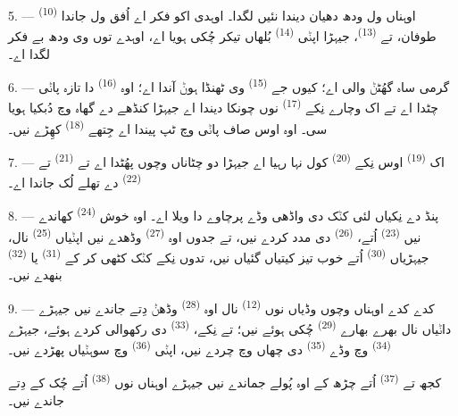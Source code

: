 \VUsaut{5.0mm}
\VUsaut{3.4mm}

5. ---  \textsuperscript{(10)} اوہناں ول ودھ دھیان دیندا نئیں لگدا۔
اوہدی اکو فکر اے اُفق ول جاندا طوفان، تے  \textsuperscript{(13)}،
جیہڑا اپݨی  \textsuperscript{(14)} بُلھاں تیکر چُکی ہویا اے، اوہدے
توں وی ودھ بے فکر لگدا اے۔

6. --- گرمی ساہ گھُٹݨ والی اے؛ کیوں جے  \textsuperscript{(15)} وی
ٹھنڈا ہوݨ آندا اے؛ اوہ  \textsuperscript{(16)} دا تازہ پاݨی چٹدا اے
تے اک وچارے نِکے  \textsuperscript{(17)} نوں چونکا دیندا اے جیہڑا کنڈھے
دے گھاہ وچ دُبکیا ہویا سی۔ اوہ اوس صاف پاݨی وچ ٹپ پیندا اے جِتھے
 \textsuperscript{(18)} کھِڑے نیں۔

7. --- اک  \textsuperscript{(19)} اوس نِکے 
\textsuperscript{(20)} کول نہا رہیا اے جیہڑا دو چٹاناں وچوں پھُٹدا اے تے
 \textsuperscript{(21)} تے  \textsuperscript{(22)} دے تھلے لُک جاندا اے۔

\VUsaut{5.0mm}
\VUsaut{3.4mm}

8. --- پنڈ دے نِکیاں لئی کݨک دی واڈھی وڈے پرچاوے دا ویلا اے۔ اوہ خوش
 \textsuperscript{(24)} کھاندے نیں 
\textsuperscript{(23)} اُتے،  \textsuperscript{(26)} دی مدد کردے
نیں، تے جدوں اوہ  \textsuperscript{(27)} وڈھدے نیں اپݨیاں
 \textsuperscript{(25)} نال، جیہڑیاں 
\textsuperscript{(30)} اُتے خوب تیز کیتیاں گئیاں نیں، تدوں نِکے کݨک کٹھی کر کے
 \textsuperscript{(31)} یا  \textsuperscript{(32)}
بنھدے نیں۔

9. --- کدے کدے اوہناں وچوں وڈیاں نوں  \textsuperscript{(12)} نال اوہ
 \textsuperscript{(28)} وڈھݨ دِتے جاندے نیں جیہڑے داݨیاں نال
بھرے بھارے  \textsuperscript{(29)} چُکی ہوئے نیں؛ تے نِکے،
 \textsuperscript{(33)} دی رکھوالی کردے ہوئے، جیہڑے
 \textsuperscript{(34)} وچ وڈے 
\textsuperscript{(35)} دی چھاں وچ چردے نیں، اپݨی  \textsuperscript{(36)}
وچ سوہݨیاں  پھڑدے نیں۔

کجھ تے  \textsuperscript{(37)} اُتے چڑھ کے اوہ پُولے جماندے نیں جیہڑے
اوہناں نوں  \textsuperscript{(38)} اُتے چُک کے دِتے جاندے نیں۔

